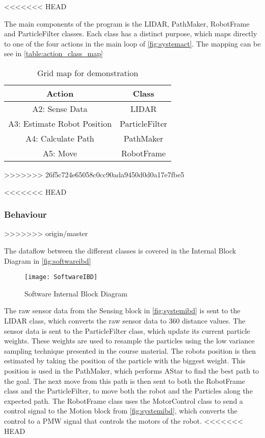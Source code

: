 \documentclass[Main]{subfiles}
\begin{document}
<<<<<<< HEAD

		The main components of the program is the LIDAR, PathMaker, RobotFrame and ParticleFilter classes. 
		Each class has a distinct purpose, which maps directly to one of the four  actions in the main loop of \autoref{fig:systemact}.
		The mapping can be see in \autoref{table:action_class_map}
		 
		\begin{table}[H]
			\centering
			\begin{tabular}{|c|c|}
			\hline
				Action & Class \\ 
			\hline
				A2: Sense Data & LIDAR  \\ 
			\hline
				A3: Estimate Robot Position & ParticleFilter  \\ 
			\hline
				A4: Calculate Path & PathMaker  \\ 
			\hline
				A5: Move & RobotFrame  \\ 
			\hline
			\end{tabular}
			\caption{Grid map for demonstration}
			\label{table:action_class_map} 
		\end{table} \noindent
>>>>>>> 26f5c724e65058c0cc90ada9450d0d0a17e7fbe5
		
<<<<<<< HEAD
	\subsubsection{Behaviour} %
	\label{subsub:software_behaviour}
>>>>>>> origin/master
	
		The dataflow between the different classes is covered in the Internal Block Diagram in \autoref{fig:softwareibd}
		
		\begin{figure}[H]
			\centering
			\texttt{[image: SoftwareIBD]}
			\caption{Software Internal Block Diagram}
			\label{fig:softwareibd}
		\end{figure}

		The raw sensor data from the Sensing block in \autoref{fig:systemibd} is sent to the LIDAR class, which  converts the raw sensor data to 360 distance values.
		The sensor data is sent to the ParticleFilter class, which update its current particle weights. 
		These weights are used to resample the particles using the low variance sampling technique presented in the course material.
		The robots position is then estimated by taking the position of the particle with the biggest weight.
		This position is used in the PathMaker, which performs AStar to find the best path to the goal. The next move from this path is then sent to both the RobotFrame class and the ParticleFilter, to move both the robot and the Particles along the expected path.
		The RobotFrame class uses the MotorControl class to send a control signal to the Motion block from \autoref{fig:systemibd}, which converts the control to a PMW signal that controls the motors of the robot.
<<<<<<< HEAD
	
\end{document}
